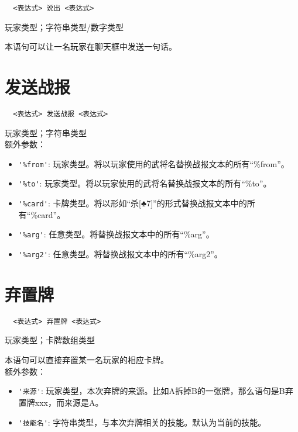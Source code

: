 \begin{verbatim}
  <表达式> 说出 <表达式>
\end{verbatim}

玩家类型；字符串类型/数字类型

本语句可以让一名玩家在聊天框中发送一句话。

\section{发送战报}

\begin{verbatim}
  <表达式> 发送战报 <表达式>
\end{verbatim}

玩家类型；字符串类型 \\

额外参数：

\begin{itemize}
  \item \verb|'%from'|: 玩家类型。将以玩家使用的武将名替换战报文本的所有“\%from”。
  \item \verb|'%to'|: 玩家类型。将以玩家使用的武将名替换战报文本的所有“\%to”。
  \item \verb|'%card'|: 卡牌类型。将以形如“杀[♣7]”的形式替换战报文本中的所有“\%card”。
  \item \verb|'%arg'|: 任意类型。将替换战报文本中的所有“\%arg”。
  \item \verb|'%arg2'|: 任意类型。将替换战报文本中的所有“\%arg2”。
\end{itemize}

\section{弃置牌}

\begin{verbatim}
  <表达式> 弃置牌 <表达式>
\end{verbatim}

玩家类型；卡牌数组类型

本语句可以直接弃置某一名玩家的相应卡牌。 \\

额外参数：

\begin{itemize}
  \item \verb|'来源'|: 玩家类型，本次弃牌的来源。比如A拆掉B的一张牌，那么语句是B弃置牌xxx，而来源是A。
  \item \verb|'技能名'|: 字符串类型，与本次弃牌相关的技能。默认为当前的技能。
\end{itemize}

